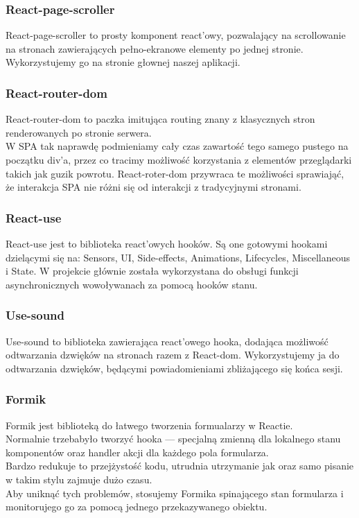 \documentclass[a4paper,11pt]{report}
\begin{document}
\subsubsection{React-page-scroller}
React-page-scroller\cite{react-page-scroller} to prosty komponent react'owy,
 pozwalający na scrollowanie na stronach zawierających pełno-ekranowe elementy po jednej stronie.
 Wykorzystujemy go na stronie głownej naszej aplikacji.\\

\subsubsection{React-router-dom}
React-router-dom\cite{react-router-dom} to paczka imitująca routing znany z klasycznych stron renderowanych po stronie serwera.\\
W SPA tak naprawdę podmieniamy cały czas zawartość tego samego pustego na początku div'a,
 przez co tracimy możliwość korzystania z elementów przeglądarki takich jak guzik powrotu.
React-roter-dom przywraca te możliwości sprawiająć, że interakcja SPA nie różni się od interakcji z tradycyjnymi stronami.

\subsubsection{React-use}
React-use\cite{react-use} jest to biblioteka react'owych hooków.
 Są one gotowymi hookami dzielącymi się na: Sensors, UI, Side-effects,
 Animations, Lifecycles, Miscellaneous i State. 
 W projekcie głównie została wykorzystana do obsługi funkcji asynchronicznych wowoływanach za pomocą hooków stanu. \\  

\subsubsection{Use-sound}
Use-sound\cite{use-sound} to biblioteka zawierająca react'owego hooka,
 dodająca możliwość odtwarzania dzwięków na stronach razem z React-dom.
 Wykorzystujemy ja do odtwarzania dzwięków, będącymi powiadomieniami zbliżającego się końca sesji.\\ 

\subsubsection{Formik}
Formik\cite{formik} jest biblioteką do łatwego tworzenia formualarzy w Reactie.\\
 Normalnie trzebabyło tworzyć hooka — specjalną zmienną dla lokalnego stanu komponentów oraz handler akcji dla każdego pola formularza.\\
 Bardzo redukuje to przejżystość kodu, utrudnia utrzymanie jak oraz samo pisanie w takim stylu zajmuje dużo czasu.\\
 Aby uniknąć tych problemów, stosujemy Formika spinającego stan formularza i monitorujego go za pomocą jednego przekazywanego obiektu.
\end{document}
